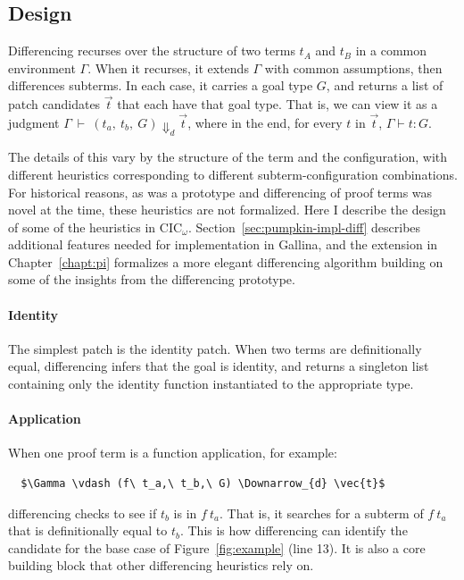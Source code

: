 \subsection{Design}
\label{sec:pumpkin-diff-design}


Differencing recurses over the structure of two terms $t_A$ and $t_B$ in a common environment $\Gamma$.
When it recurses, it extends $\Gamma$ with common assumptions, then differences subterms.
In each case, it carries a goal type $G$, and returns a list of patch candidates $\vec{t}$ that each have that goal type.
That is, we can view it as a judgment $\Gamma\ \vdash\ (t_a,\ t_b,\ G) \Downarrow_{d} \vec{t}$,
where in the end, for every $t$ in $\vec{t}$, $\Gamma \vdash t : G$.

The details of this vary by the structure of the term and the configuration, with different heuristics corresponding to different subterm-configuration combinations.
For historical reasons, as \sysname was a prototype and differencing of proof terms was novel at the time, these heuristics are not formalized. %
Here I describe the design of some of the heuristics in CIC${_\omega}$.
Section~\ref{sec:pumpkin-impl-diff} describes additional features needed for implementation in Gallina,
and the \toolnamec extension in Chapter~\ref{chapt:pi} formalizes a more elegant differencing algorithm building on some of the insights from the \sysname differencing prototype.

\paragraph{Identity}
The simplest patch is the identity patch.
When two terms are definitionally equal, %
differencing infers that the goal is identity,
and returns a singleton list containing only the identity function instantiated to the appropriate type.

\paragraph{Application}
When one proof term is a function application, for example:

\begin{lstlisting}
  $\Gamma \vdash (f\ t_a,\ t_b,\ G) \Downarrow_{d} \vec{t}$
\end{lstlisting}
differencing checks to see if $t_b$ is in $f\ t_a$.
That is, it searches for a subterm of $f\ t_a$ that is definitionally equal to $t_b$.
This is how differencing can identify the candidate for the base case of Figure~\ref{fig:example} (line 13).
It is also a core building block that other differencing heuristics rely on.

